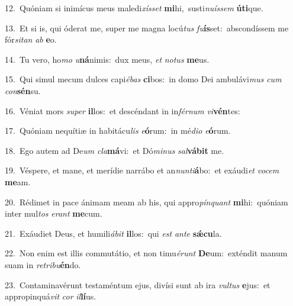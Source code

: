 {\numbfont\textcolor{\numbcolor}{12.}}~Quóniam si inimícus meus maledi\-\textit{xís}\-\textit{set} \textbf{mi}\-hi,~\star susti\-\textit{nu}\-\textit{ís}\textit{sem} \textbf{ú}\-\textbf{ti}que.\par
{\numbfont\textcolor{\numbcolor}{13.}}~Et si is, qui óderat me, super me magna locú\textit{tus} \textit{fu}\-\textbf{ís}set:~\star abscondíssem me fór\-\textit{si}\-\textit{tan} \textit{ab} \textbf{e}\-o.\par
{\numbfont\textcolor{\numbcolor}{14.}}~Tu vero, ho\textit{mo} \textit{u}\-\textbf{ná}nimis:~\star dux meus, \textit{et} \textit{no}\-\textit{tus} \textbf{me}\-us.\par
{\numbfont\textcolor{\numbcolor}{15.}}~Qui simul mecum dulces capi\-\textit{é}\-\textit{bas} \textbf{ci}\-bos:~\star in domo Dei ambulávi\textit{mus} \textit{cum} \textit{con}\-\textbf{sén}su.\par
{\numbfont\textcolor{\numbcolor}{16.}}~Véniat mors \textit{su}\-\textit{per} \textbf{il}\-los:~\star et descéndant in in\-\textit{fér}\-\textit{num} \textit{vi}\-\textbf{vén}tes:\par
{\numbfont\textcolor{\numbcolor}{17.}}~Quóniam nequítiæ in habitácu\textit{lis} \textit{e}\-\textbf{ó}rum:~\star in mé\-\textit{di}\-\textit{o} \textit{e}\-\textbf{ó}rum.\par
{\numbfont\textcolor{\numbcolor}{18.}}~Ego autem ad De\textit{um} \textit{cla}\-\textbf{má}vi:~\star et Dó\-\textit{mi}\-\textit{nus} \textit{sal}\-\textbf{vá}\textbf{bit} me.\par
{\numbfont\textcolor{\numbcolor}{19.}}~Véspere, et mane, et merídie narrábo et an\-\textit{nun}\-\textit{ti}\textbf{á}bo:~\star et exáudi\textit{et} \textit{vo}\-\textit{cem} \textbf{me}\-am.\par
{\numbfont\textcolor{\numbcolor}{20.}}~Rédimet in pace ánimam meam ab his, qui appro\-\textit{pín}\-\textit{quant} \textbf{mi}\-hi:~\star quóniam inter mul\textit{tos} \textit{e}\-\textit{rant} \textbf{me}\-cum.\par
{\numbfont\textcolor{\numbcolor}{21.}}~Exáudiet Deus, et humili\-\textit{á}\-\textit{bit} \textbf{il}\-los:~\star qui \textit{est} \textit{an}\-\textit{te} \textbf{sǽ}\-\textbf{cu}la.\par
{\numbfont\textcolor{\numbcolor}{22.}}~Non enim est illis commutátio, et non timu\-\textit{é}\-\textit{runt} \textbf{De}\-um:~\star exténdit manum suam in \textit{re}\-\textit{tri}\textit{bu}\textbf{én}do.\par
{\numbfont\textcolor{\numbcolor}{23.}}~Contaminavérunt testaméntum ejus, divísi sunt ab ira \textit{vul}\-\textit{tus} \textbf{e}\-jus:~\star et appropinquá\textit{vit} \textit{cor} \textit{il}\-\textbf{lí}us.\par
